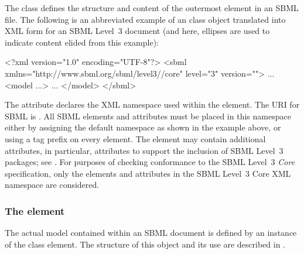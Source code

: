 The \SBML class defines the structure and content of the
 outermost element in an SBML file.  The following is
an abbreviated example of an \SBML class object translated into
XML form for an SBML Level~3 \thisV document (and here,
ellipses  are used to indicate content elided from this example):

\begin{example}
<?xml version="1.0" encoding="UTF-8"?>
<sbml xmlns="http://www.sbml.org/sbml/level3/\thisvlc/core" level="3" version="\sbmlversionnum">
  ...
  <model ...>
     ...
  </model>
</sbml>
\end{example}

The attribute  declares the XML namespace used within
the  element.  The URI for SBML \thisLV is
.  All SBML
\thisLV elements and attributes must be placed in this namespace
either by assigning the default namespace as shown in the example
above, or using a tag prefix on every element.  The 
element may contain additional attributes, in particular,
attributes to support the inclusion of SBML Level~3 packages; see
.  For purposes of checking
conformance to the SBML Level~3 \emph{Core} specification, only
the elements and attributes in the SBML Level~3 Core XML namespace
are considered.





\subsubsection{The  element}

The actual model contained within an SBML document is defined by
an instance of the \Model class element.  The structure of this
object and its use are described in .



